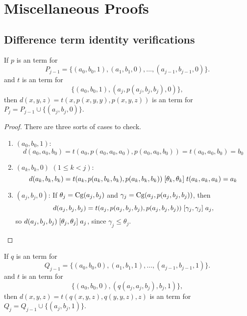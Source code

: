 \newpage
\appendix

\section{Miscellaneous Proofs}
\subsection{Difference term identity verifications}
\label{app:dt-ids}

\begin{lemma}
If $p$ is an \ld term for 
\begin{equation*}
P_{j-1} = \{(a_0, b_0, 1), (a_1, b_1, 0), \dots, (a_{j-1}, b_{j-1}, 0)\}.  
\end{equation*}
and $t$ is an \ld term for
\begin{equation*}
\{(a_0, b_0, 1), (a_j, p(a_j, b_j, b_j), 0)\},
\end{equation*}
then $d(x,y,z) = t(x, p(x,y,y), p(x,y,z))$ is an \ld term for 
$P_{j} = P_{j-1}  \cup \{(a_j, b_j, 0)\}$.  
\end{lemma}

\begin{proof} There are three sorts of cases to check.
\begin{enumerate}[1.]
\item $(a_0, b_0, 1)$: 
\begin{equation*}
d(a_0, a_0, b_0) =  
t(a_0, p(a_0,a_0,a_0), p(a_0,a_0,b_0)) = 
t(a_0, a_0, b_0) = b_0
\end{equation*}
 
\item $(a_k, b_k, 0)$ $(1\leq k < j)$: 
\begin{equation*}
d(a_k, b_k, b_k) =  
t(a_k, p(a_k,b_k,b_k), p(a_k,b_k,b_k)) 
\mathrel{[\theta_k, \theta_k]}  
t(a_k, a_k, a_k)  = a_k
\end{equation*}

\item $(a_j, b_j, 0)$: 
If  
$\theta_j = \operatorname{Cg}(a_j, b_j)$ and 
$\gamma_j = \operatorname{Cg}(a_j, p(a_j, b_j, b_j))$, then
\begin{equation*}
d(a_j, b_j, b_j) =  
t(a_j, p(a_j,b_j,b_j), p(a_j,b_j,b_j)) 
\mathrel{[\gamma_j, \gamma_j]} a_j,
\end{equation*}
so 
$d(a_j, b_j, b_j) \mathrel{[\theta_j, \theta_j]} a_j$,
since $\gamma_j \leq \theta_j$. 
\end{enumerate}
\end{proof}


\begin{lemma}
If $q$ is an \ld term for 
\begin{equation*}
Q_{j-1} = \{(a_0, b_0, 0), (a_1, b_1, 1), \dots, (a_{j-1}, b_{j-1}, 1)\}.  
\end{equation*}
and $t$ is an \ld term for
\begin{equation*}
\{(a_0, b_0, 0), (q(a_j, a_j, b_j), b_j, 1)\},
\end{equation*}
then $d(x,y,z) = t(q(x,y,z), q(y,y,z), z)$ is an \ld term for 
$Q_{j} = Q_{j-1}  \cup \{(a_j, b_j, 1)\}$.  
\end{lemma}

